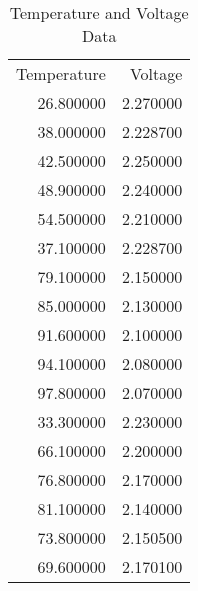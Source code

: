 \begin{table}
\caption{Temperature and Voltage Data}
\label{tab:temp_voltage}
\begin{tabular}{r|r}

Temperature & Voltage \\

26.800000 & 2.270000  \\
38.000000 & 2.228700 \\
42.500000 & 2.250000  \\
48.900000 & 2.240000 \\
54.500000 & 2.210000 \\
37.100000 & 2.228700  \\
79.100000 & 2.150000 \\
85.000000 & 2.130000 \\
91.600000 & 2.100000 \\
94.100000 & 2.080000  \\
97.800000 & 2.070000  \\
33.300000 & 2.230000  \\
66.100000 & 2.200000  \\
76.800000 & 2.170000 \\
81.100000 & 2.140000 \\
73.800000 & 2.150500 \\
69.600000 & 2.170100  \\

\end{tabular}
\end{table}